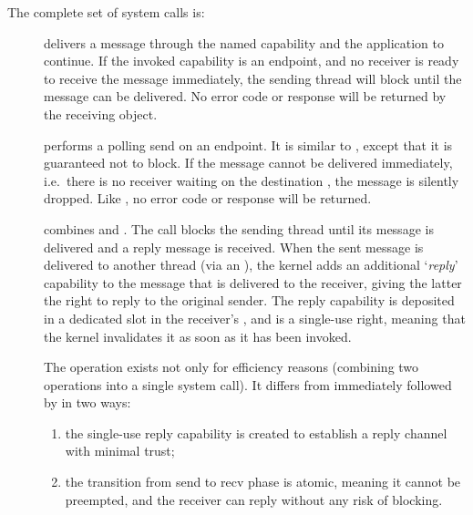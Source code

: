 The complete set of system calls is:
\begin{description}
    \item[] delivers a message through the named
    capability and the application to continue. If the invoked
    capability is an endpoint, and no receiver is ready to receive the message
    immediately, the sending thread will block until the message can be
    delivered. No error code or response will be returned by the receiving
    object.

    \item[] performs a polling send
      on an endpoint. It
    is similar to , except that it is
    guaranteed not to block. If the message
    cannot be delivered immediately, i.e.\ there is no receiver waiting
    on the destination , the message is silently dropped. Like
    , no error code or response will be returned.

    \item[] combines 
      and . The call
      blocks the sending thread until its message is delivered and a reply message is received. When the
    sent message is delivered to another thread (via an
    ), the kernel adds an
    additional `\emph{reply}' capability to the message that is delivered
    to the receiver, giving the latter the right to reply to the original sender. The reply
    capability is deposited in a dedicated slot in the receiver's
    , and is a single-use right, meaning that the kernel
    invalidates it as soon as it has been invoked.

    The  operation exists not only for
    efficiency reasons (combining two operations into a single system
    call). It differs from
     immediately followed by
     in two ways:
    \begin{enumerate}
    \item the single-use reply capability is created to establish a 
      reply channel with minimal trust;
    \item the transition from send to recv phase is atomic, meaning it
      cannot be preempted, and the receiver can reply without any risk
      of blocking.
    \end{enumerate}


\end{description}
